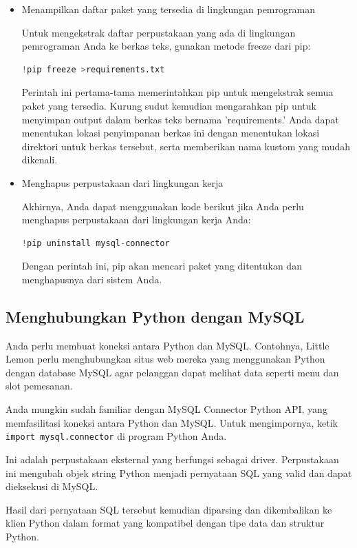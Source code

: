 \documentclass{article}
\begin{document}
\begin{itemize}
      \item Menampilkan daftar paket yang tersedia di lingkungan pemrograman

            Untuk mengekstrak daftar perpustakaan yang ada di lingkungan pemrograman Anda ke berkas teks, gunakan metode freeze dari pip:
            \begin{lstlisting}[language=Python, caption={}, captionpos=b]
!pip freeze >requirements.txt
\end{lstlisting}

            Perintah ini pertama-tama memerintahkan pip untuk mengekstrak semua paket yang tersedia. Kurung sudut kemudian mengarahkan pip untuk menyimpan output dalam berkas teks bernama 'requirements.' Anda dapat menentukan lokasi penyimpanan berkas ini dengan menentukan lokasi direktori untuk berkas tersebut, serta memberikan nama kustom yang mudah dikenali.

      \item Menghapus perpustakaan dari lingkungan kerja

            Akhirnya, Anda dapat menggunakan kode berikut jika Anda perlu menghapus perpustakaan dari lingkungan kerja Anda:
            \begin{lstlisting}[language=Python, caption={}, captionpos=b]
!pip uninstall mysql-connector
\end{lstlisting}
            Dengan perintah ini, pip akan mencari paket yang ditentukan dan menghapusnya dari sistem Anda.

\end{itemize}

\subsection{Menghubungkan Python dengan MySQL}
Anda perlu membuat koneksi antara Python dan MySQL. Contohnya, Little Lemon perlu menghubungkan situs web mereka yang menggunakan Python dengan database MySQL agar pelanggan dapat melihat data seperti menu dan slot pemesanan.

Anda mungkin sudah familiar dengan MySQL Connector Python API, yang memfasilitasi koneksi antara Python dan MySQL. Untuk mengimpornya, ketik \verb|import mysql.connector| di program Python Anda.

Ini adalah perpustakaan eksternal yang berfungsi sebagai driver. Perpustakaan ini mengubah objek string Python menjadi pernyataan SQL yang valid dan dapat dieksekusi di MySQL.

Hasil dari pernyataan SQL tersebut kemudian diparsing dan dikembalikan ke klien Python dalam format yang kompatibel dengan tipe data dan struktur Python.
\end{document}

